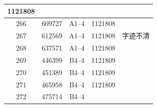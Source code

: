 \documentclass[UTF8,10pt,a4paper,fontset=fandol]{ctexart}
\newcommand{\fieldvalue}[1]{#1}
\newcommand{\handwritten}[1]{#1}
\begin{document}
\begin{tabular}{|c|c|c|c|p{2.5cm}|}
\fieldvalue{1121808} & \\
\hline
\fieldvalue{266} &
\fieldvalue{609727} &
\fieldvalue{A1--4} &
\fieldvalue{1121808} & \\
\hline
\fieldvalue{267} &
\fieldvalue{612569} &
\fieldvalue{A1--4} &
\fieldvalue{1121808} &
\fieldvalue{\handwritten{字迹不清}} \\
\hline
\fieldvalue{268} &
\fieldvalue{637571} &
\fieldvalue{A1--4} &
\fieldvalue{1121808} & \\
\hline
\fieldvalue{269} &
\fieldvalue{446399} &
\fieldvalue{B4--4} &
\fieldvalue{1121809} & \\
\hline
\fieldvalue{270} &
\fieldvalue{451389} &
\fieldvalue{B4--4} &
\fieldvalue{1121809} & \\
\hline
\fieldvalue{271} &
\fieldvalue{465958} &
\fieldvalue{B4--4} &
\fieldvalue{1121809} & \\
\hline
\fieldvalue{272} &
\fieldvalue{475714} &
\fieldvalue{B4--4} &

\end{tabular}
\end{document}
